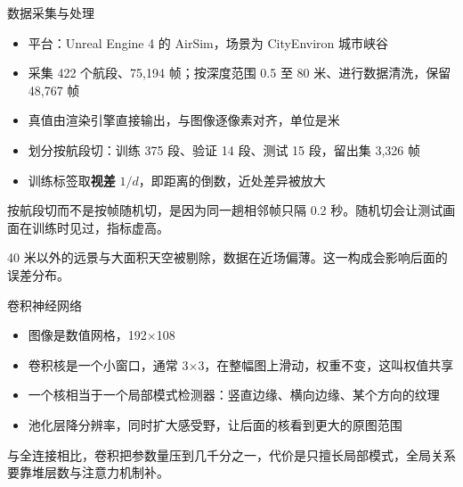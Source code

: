 \documentclass[serif, aspectratio=169]{beamer}
\newcommand{\currentref}{}
\newcommand{\src}[1]{\gdef\currentref{#1}}
\begin{document}
\begin{frame}{数据采集与处理}

\begin{itemize}
    \item 平台：Unreal Engine 4 的 AirSim，场景为 CityEnviron 城市峡谷
    \item 采集 422 个航段、75,194 帧；按深度范围 0.5 至 80 米、进行数据清洗，保留 48,767 帧
    \item 真值由渲染引擎直接输出，与图像逐像素对齐，单位是米
    \item 划分按航段切：训练 375 段、验证 14 段、测试 15 段，留出集 3,326 帧
    \item 训练标签取\textbf{视差} $1/d$，即距离的倒数，近处差异被放大
\end{itemize}

\vspace{0.3cm}
按航段切而不是按帧随机切，是因为同一趟相邻帧只隔 0.2 秒。随机切会让测试画面在训练时见过，指标虚高。

\vspace{0.15cm}
40 米以外的远景与大面积天空被剔除，数据在近场偏薄。这一构成会影响后面的误差分布。

\src{Shah S, Dey D, Lovett C, Kapoor A. AirSim: High-Fidelity Visual and Physical Simulation for Autonomous Vehicles. FSR, 2017.}
\end{frame}

\begin{frame}{卷积神经网络}

\begin{itemize}
    \item 图像是数值网格，192$\times$108 
    \item 卷积核是一个小窗口，通常 3$\times$3，在整幅图上滑动，权重不变，这叫权值共享
    \item 一个核相当于一个局部模式检测器：竖直边缘、横向边缘、某个方向的纹理
    \item 池化层降分辨率，同时扩大感受野，让后面的核看到更大的原图范围
\end{itemize}

\vspace{0.2cm}
与全连接相比，卷积把参数量压到几千分之一，代价是只擅长局部模式，全局关系要靠堆层数与注意力机制补。

\src{LeCun Y, Bottou L, Bengio Y, Haffner P. Gradient-Based Learning Applied to Document Recognition. Proceedings of the IEEE, 1998.}
\end{frame}
\end{document}
